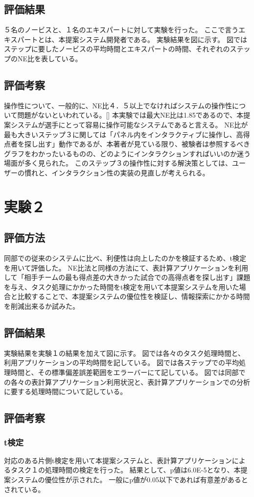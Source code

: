\documentclass[sotsuron]{kuee}
\begin{document}
\subsection{評価結果}
５名のノービスと、１名のエキスパートに対して実験を行った。
ここで言うエキスパートとは、本提案システム開発者である。
実験結果を図に示す。
図ではステップに要したノービスの平均時間とエキスパートの時間、それぞれのステップのNE比を表している。
\subsection{評価考察}
操作性について、一般的に、NE比４．５以上でなければシステムの操作性について問題がないといわれている。[]
本実験では最大NE比は1.85であるので、本提案システムが選手にとって容易に操作可能なシステムであると言える。
NE比が最も大きいステップ３に関しては「パネル内をインタラクティブに操作し、高得点者を探し出す」動作であるが、本著者が見ている限り、被験者は参照するべきグラフをわかったいるものの、どのようにインタラクションすればいいのか迷う場面が多く見られた。
このステップ３の操作性に対する解決策としては、ユーザーの慣れと、インタラクション性の実装の見直しが考えられる。
\section{実験２}
\subsection{評価方法}
同部での従来のシステムに比べ、利便性は向上したのかを検証するため、t検定を用いて評価した。
NE比法と同様の方法にて、表計算アプリケーションを利用して「相手チームの最も得点差の大きかった試合での高得点者を探し出す」課題を与え、タスク処理にかかった時間をt検定を用いて本提案システムを用いた場合と比較することで、本提案システムの優位性を検証し、情報探索にかかる時間を削減出来るか試みた。
\subsection{評価結果}
実験結果を実験１の結果を加えて図に示す。
図では各々のタスク処理時間と、利用アプリケーションの平均時間を記している。
図では各ステップでの平均処理時間と、その標準偏差誤差範囲をエラーバーにて記している。
図では同部での各々の表計算アプリケーション利用状況と、表計算アプリケーションでの分析に要する処理時間について記している。
\subsection{評価考察}
\subsubsection{t検定}
対応のある片側t検定を用いて本提案システムと、表計算アプリケーションによるタスク１の処理時間の検定を行った。
結果として、p値は6.0E-5となり、本提案システムの優位性が示された。
一般にp値が0.05以下であれば有意差があるとされている。
\end{document}
